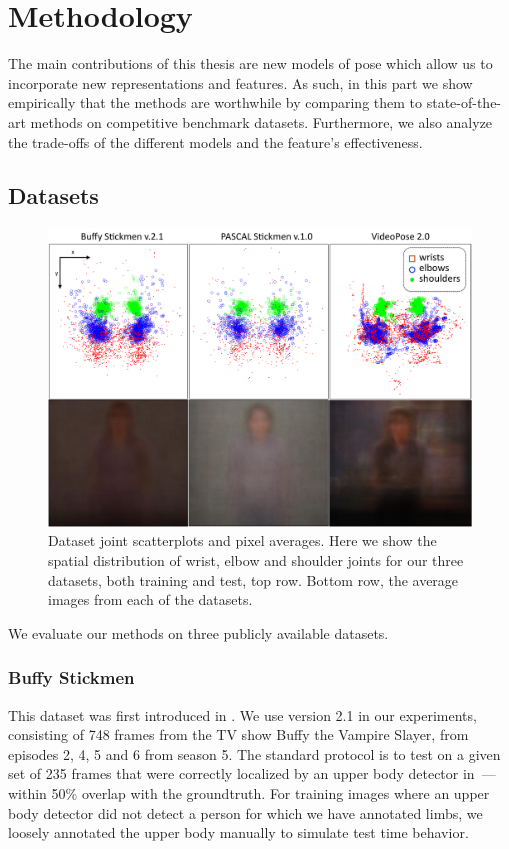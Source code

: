 \chapter{Methodology}
The main contributions of this thesis are new models of pose which allow us to 
incorporate new representations and features.  As such, in this part we show 
empirically that the methods are worthwhile by comparing them to 
state-of-the-art methods on competitive benchmark datasets.  Furthermore, we 
also analyze the trade-offs of the different models and the feature's 
effectiveness.

\section{Datasets}\label{sec:datasets}
\begin{figure}[tb]
\begin{center}
\includegraphics[width=1.05\textwidth]{figs/dataset-scatterplots.pdf}
\caption[Dataset joint scatterplots and pixel averages.]{Dataset joint 
scatterplots and pixel averages.  Here we show the spatial distribution of 
wrist, elbow and shoulder joints for our three datasets, both training and 
test, top row.  Bottom row, the average images from each of the datasets.}
\label{fig:dataset-scatterplots}
\end{center}
\end{figure}



We evaluate our methods on three publicly available datasets.

\subsection{Buffy Stickmen}
This dataset was first introduced in \citet{ferrari08}.  We use version 2.1 in 
our experiments, consisting of 748 frames from the TV show Buffy the Vampire 
Slayer, from episodes 2, 4, 5 and 6 from season 5.  The standard protocol is to 
test on a given set of 235 frames that were correctly localized by an upper 
body detector in~\citet{ferrari08}---within 50\% overlap with the groundtruth.  
For training images where an upper body detector did not detect a person for 
which we have annotated limbs, we loosely annotated the upper body manually to 
simulate test time behavior.
  

